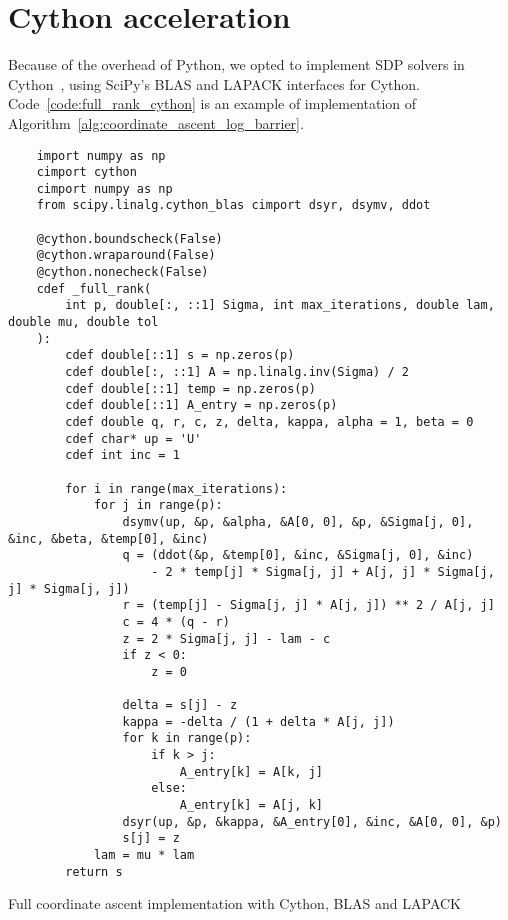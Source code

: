 \chapter{Cython acceleration}\label{ch:cython_acceleration}
Because of the overhead of Python, we opted to implement SDP solvers in Cython~\cite{cython},
using SciPy's BLAS and LAPACK interfaces for Cython.
Code~\ref{code:full_rank_cython} is an example of implementation of Algorithm~\ref{alg:coordinate_ascent_log_barrier}.
\begin{calgorithm}
\begin{verbatim}
    import numpy as np
    cimport cython
    cimport numpy as np
    from scipy.linalg.cython_blas cimport dsyr, dsymv, ddot

    @cython.boundscheck(False)
    @cython.wraparound(False)
    @cython.nonecheck(False)
    cdef _full_rank(
        int p, double[:, ::1] Sigma, int max_iterations, double lam, double mu, double tol
    ):
        cdef double[::1] s = np.zeros(p)
        cdef double[:, ::1] A = np.linalg.inv(Sigma) / 2
        cdef double[::1] temp = np.zeros(p)
        cdef double[::1] A_entry = np.zeros(p)
        cdef double q, r, c, z, delta, kappa, alpha = 1, beta = 0
        cdef char* up = 'U'
        cdef int inc = 1

        for i in range(max_iterations):
            for j in range(p):
                dsymv(up, &p, &alpha, &A[0, 0], &p, &Sigma[j, 0], &inc, &beta, &temp[0], &inc)
                q = (ddot(&p, &temp[0], &inc, &Sigma[j, 0], &inc)
                    - 2 * temp[j] * Sigma[j, j] + A[j, j] * Sigma[j, j] * Sigma[j, j])
                r = (temp[j] - Sigma[j, j] * A[j, j]) ** 2 / A[j, j]
                c = 4 * (q - r)
                z = 2 * Sigma[j, j] - lam - c
                if z < 0:
                    z = 0

                delta = s[j] - z
                kappa = -delta / (1 + delta * A[j, j])
                for k in range(p):
                    if k > j:
                        A_entry[k] = A[k, j]
                    else:
                        A_entry[k] = A[j, k]
                dsyr(up, &p, &kappa, &A_entry[0], &inc, &A[0, 0], &p)
                s[j] = z
            lam = mu * lam
        return s
\end{verbatim}
\caption{
    Full coordinate ascent implementation with Cython, BLAS and LAPACK
}\label{code:full_rank_cython}
\end{calgorithm}
